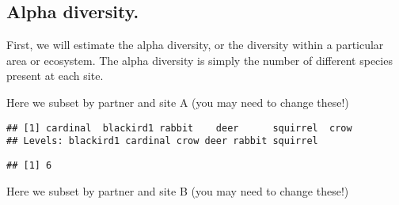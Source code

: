 \documentclass[]{book}
\newenvironment{Shaded}{\begin{snugshade}}{\end{snugshade}}
\newcommand{\CommentTok}[1]{\textcolor[rgb]{0.56,0.35,0.01}{\textit{#1}}}
\newcommand{\KeywordTok}[1]{\textcolor[rgb]{0.13,0.29,0.53}{\textbf{#1}}}
\newcommand{\NormalTok}[1]{#1}
\newcommand{\OperatorTok}[1]{\textcolor[rgb]{0.81,0.36,0.00}{\textbf{#1}}}
\newcommand{\StringTok}[1]{\textcolor[rgb]{0.31,0.60,0.02}{#1}}
\begin{document}
\hypertarget{alpha-diversity.}{%
\subsection*{Alpha diversity.}\label{alpha-diversity.}}

First, we will estimate the alpha diversity, or the diversity within a particular area or ecosystem. The alpha diversity is simply the number of different species present at each site.

Here we subset by partner and site A (you may need to change these!)

\begin{Shaded}
\end{Shaded}

\begin{verbatim}
## [1] cardinal  blackird1 rabbit    deer      squirrel  crow     
## Levels: blackird1 cardinal crow deer rabbit squirrel
\end{verbatim}

\begin{Shaded}
\end{Shaded}

\begin{verbatim}
## [1] 6
\end{verbatim}

Here we subset by partner and site B (you may need to change these!)

\begin{Shaded}
\end{Shaded}
\end{document}
